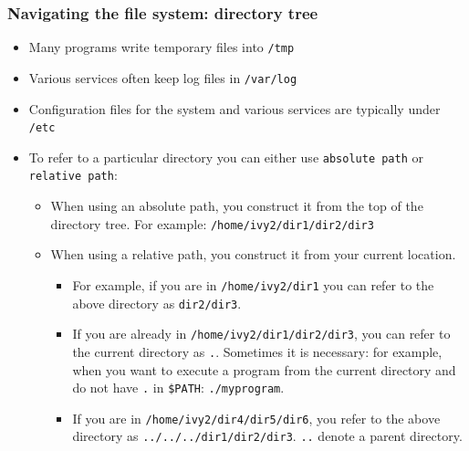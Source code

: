 \documentclass{beamer}
\begin{document}
\begin{frame}[fragile]
  \frametitle{Navigating the file system: directory tree}
  \begin{itemize}
  \item Many programs write temporary files into {\color{mycolorcli}\verb|/tmp|}
  \item Various services often keep log files in {\color{mycolorcli}\verb|/var/log|}
  \item Configuration files for the system and various services are typically under {\color{mycolorcli}\verb|/etc|}
  \item To refer to a particular directory you can either use {\color{mycolordef}\verb|absolute path|} or {\color{mycolordef}\verb|relative path|}:
    \begin{itemize}
    \item When using an absolute path, you construct it from the top of the directory tree. For example: {\color{mycolorcli}\verb|/home/ivy2/dir1/dir2/dir3|}
    \item When using a relative path, you construct it from your current location. 
      \begin{itemize}
      \item For example, if you are in {\color{mycolorcli}\verb|/home/ivy2/dir1|} you can refer to the above directory as 
        {\color{mycolorcli}\verb|dir2/dir3|}. 
      \item If you are already in {\color{mycolorcli}\verb|/home/ivy2/dir1/dir2/dir3|}, you can refer to the current directory as  {\color{mycolorcli}\verb|.|}. Sometimes it is necessary: for example,
        when you want to execute a program from the current directory and do not have {\color{mycolorcli}\verb|.|} in {\color{mycolorcli}\verb|$PATH|}: {\color{mycolorcli}\verb|./myprogram|}. 
      \item If you are in  {\color{mycolorcli}\verb|/home/ivy2/dir4/dir5/dir6|}, you refer to the above directory as {\color{mycolorcli}\verb|../../../dir1/dir2/dir3|}.  {\color{mycolorcli}\verb|..|} denote a
        parent directory.
      \end{itemize}
    \end{itemize}
  \end{itemize}
\end{frame}
\end{document}
